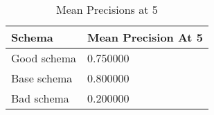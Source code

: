 


\begingroup
    \renewcommand{\arraystretch}{2} %
    \begin{table}[]
        \centering
        \begin{tabular}{ l | l }
            Schema & Mean Precision At 5 \\
            \hline
            Good schema & 0.750000 \\
            Base schema & 0.800000 \\
            Bad schema & 0.200000 \\
        \end{tabular}
        \caption{Mean Precisions at 5}
        \label{tab:mp5}
    \end{table}
\endgroup